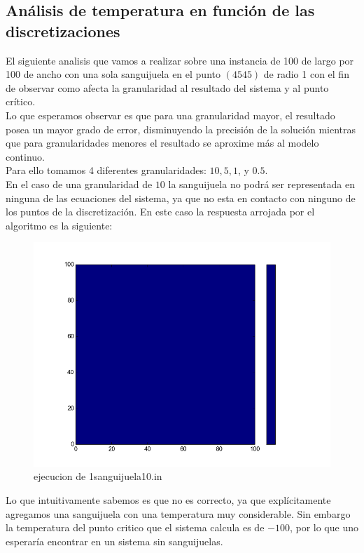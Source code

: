 \subsection{Análisis de temperatura en función de las discretizaciones}
El siguiente analisis que vamos a realizar sobre una instancia de 100 de largo por 100 de ancho con una sola sanguijuela en el punto $(45 45)$ de radio 1 con el fin de observar como afecta la granularidad al resultado del sistema y al punto crítico.
\\
Lo que esperamos observar es que para una granularidad mayor, el resultado posea un mayor grado de error, disminuyendo la precisión de la solución mientras que para granularidades menores el resultado se aproxime más al modelo continuo.
\\
Para ello tomamos 4 diferentes granularidades: $10, 5, 1$, y $0.5$.
\\
En el caso de una granularidad de $10$ la sanguijuela no podrá ser representada en ninguna de las ecuaciones del sistema, ya que no esta en contacto con ninguno de los puntos de la discretización. En este caso la respuesta arrojada por el algoritmo es la siguiente:
\begin{figure}[H]
\centering
\includegraphics[width=400pt]{otrostests/11.png}    
\caption{ejecucion de 1sanguijuela10.in}
\end{figure}
Lo que intuitivamente sabemos es que no es correcto, ya que explícitamente agregamos una sanguijuela con una temperatura muy considerable. Sin embargo la temperatura del punto critico que el sistema calcula es de $-100$, por lo que uno esperaría encontrar en un sistema sin sanguijuelas.

